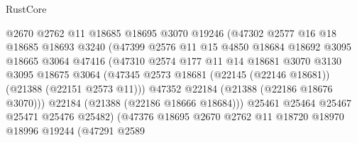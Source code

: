 \begin{lexlean}{RustCore}
\begin{coremodule}
                              @2670
                              @2762
                              @11
                              @18685
                              @18695
                              @3070
                              @19246
                              (@47302
                                @2577
                                @16
                                @18
                                @18685
                                @18693
                                @3240
                                (@47399
                                  @2576
                                  @11
                                  @15
                                  @4850
                                  @18684
                                  @18692
                                  @3095
                                  @18665
                                  @3064
                                  @47416
                                  (@47310
                                    @2574
                                    @177
                                    @11
                                    @14
                                    @18681
                                    @3070
                                    @3130
                                    @3095
                                    @18675
                                    @3064
                                    (@47345
                                      @2573
                                      @18681
                                      (@22145 (@22146 @18681))
                                      (@21388 (@22151 @2573 @11)))
                                    @47352
                                    @22184
                                    (@21388 (@22186 @18676 @3070)))
                                  @22184
                                  (@21388 (@22186 @18666 @18684)))
                                @25461
                                @25464
                                @25467
                                @25471
                                @25476
                                @25482)
                              (@47376
                                @18695
                                @2670
                                @2762
                                @11
                                @18720
                                @18970
                                @18996
                                @19244
                                (@47291
                                  @2589

\end{coremodule}
\end{lexlean}
